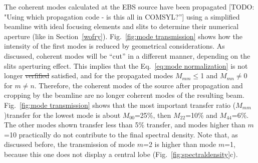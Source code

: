 \documentclass{iucr}              %
\newcommand{\todo}[1]{{\color{red}[TODO: "#1'']}}
\begin{document}
The coherent modes calculated at the EBS source have been propagated \todo{Using which propagation code - is this all in COMSYL?} using a simplified beamline  with ideal focusing elements and slits to determine their numerical aperture (like in Section~\ref{wofry}). Fig.~\ref{fig:mode transmission} shows how the intensity of the first modes is reduced by geometrical considerations. 
As discussed, coherent modes will be ``cut'' in a different manner, depending on the slits aperturing effect.
This implies that the Eq.~\ref{eq:mode normalization} is not longer {\color{green}\sout{verfified} satisfied}, and for the propagated modes $M_{mm}\le$1 and $M_{mn}\ne$0 for $m\ne n$. Therefore, the coherent modes of the source after propagation and cropping by the beamline are no longer coherent modes of the resulting beam. Fig.~\ref{fig:mode transmission} shows that the most important transfer ratio ($M_{mm}$)transfer for the lowest mode is about $M_{00}$=25\%, then $M_{22}$=10\% and $M_{44}$=6\%. The other modes shown transfer less than 5\% transfer, and modes higher than $m$=10 practically do not contribute to the final spectral density. Note that, as discussed before, the transmission of mode $m$=2 is higher than mode $m$=1, because this one does not display a central lobe (Fig.~\ref{fig:spectraldensity}c).  

\end{document}
